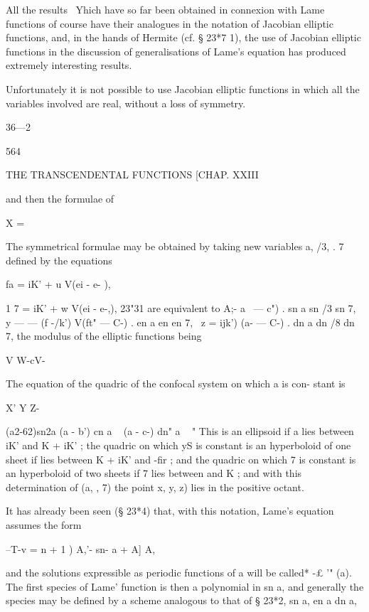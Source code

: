 {{{{{{{All the results \ Yhich have so far been obtained in connexion with Lame 
functions of course have their analogues in the notation of Jacobian elliptic 
functions, and, in the hands of Hermite (cf. § 23*7 1), the use of Jacobian 
elliptic functions in the discussion of generalisations of Lame's equation has 
produced extremely interesting results. 

Unfortunately it is not possible to use Jacobian elliptic functions in which 
all the variables involved are real, without a loss of symmetry. 

36—2 



564 



THE TRANSCENDENTAL FUNCTIONS [CHAP. XXIII 



and then the formulae of 

X = 



The symmetrical formulae may be obtained by taking new variables a, /3, 
. 7 defined by the equations 

fa = iK' + u V(ei - e- ), 

1 7 = iK' + w V(ei - e-,), 
23"31 are equivalent to 
A;- \/ a~ — c") . sn a sn /3 sn 7, 
y — — (f -/k') V(ft" — C-) . en a en   en 7, 
\  z =  ijk') \/(a- — C-) . dn a dn /8 dn 7, 
the modulus of the elliptic functions being 

V W-cV- 

The equation of the quadric of the confocal system on which a is con- 
stant is 

X' Y  Z- 

(a2-62)sn2a (a  - b') cn  a ~ (a  - c-) dn" a ~ " 
This is an ellipsoid if a lies between iK' and K + iK' ; the quadric on which 
yS is constant is an hyperboloid of one sheet if   lies between K + iK' and 
-fir ; and the quadric on which 7 is constant is an hyperboloid of two sheets if 
7 lies between and K ; and with this determination of (a,  , 7) the point 
 x, y, z) lies in the positive octant. 

It has already been seen (§ 23*4) that, with this notation, Lame's equation 
assumes the form 

--T-v =     n + 1 ) A,'- sn- a + A] A, 

and the solutions expressible as periodic functions of a will be called* -£  '" (a). 
The first species of Lame' function is then a polynomial in sn  a, and generally 
the species may be defined by a scheme analogous to that of § 23*2, 
sn a, en a dn a,   

}}}}}}}
